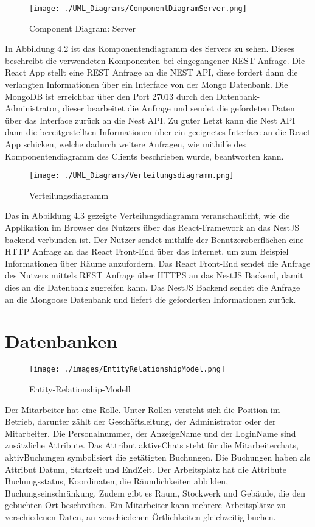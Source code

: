 \begin{figure}[!h]
    \centering
    \texttt{[image: ./UML\_Diagrams/ComponentDiagramServer.png]}
    \caption{Component Diagram: Server}
    \label{fig:ComponentDiagramServer}
\end{figure}
In Abbildung 4.2 ist das Komponentendiagramm des Servers zu sehen.
Dieses beschreibt die verwendeten Komponenten bei eingegangener REST Anfrage.
Die React App stellt eine REST Anfrage an die NEST API, diese fordert dann die verlangten Informationen über ein Interface von der Mongo Datenbank.
Die MongoDB ist erreichbar über den Port 27013 durch den Datenbank-Administrator, dieser bearbeitet die Anfrage und sendet die gefordeten Daten über das Interface zurück an die Nest API.
Zu guter Letzt kann die Nest API dann die bereitgestellten Informationen über ein geeignetes Interface an die React App schicken, welche dadurch weitere Anfragen, wie mithilfe des Komponentendiagramm des Clients beschrieben wurde, beantworten kann.



\begin{figure}[!h]
    \centering
    \texttt{[image: ./UML\_Diagrams/Verteilungsdiagramm.png]}
    \caption{Verteilungsdiagramm}
    \label{fig:Verteilungsdiagramm}
\end{figure}

Das in Abbildung 4.3 gezeigte Verteilungsdiagramm veranschaulicht, wie die Applikation im Browser des Nutzers über das React-Framework an das NestJS backend verbunden ist.
Der Nutzer sendet mithilfe der Benutzeroberflächen eine HTTP Anfrage an das React Front-End über das Internet, um zum Beispiel Informationen über Räume anzufordern.
Das React Front-End sendet die Anfrage des Nutzers mittels REST Anfrage über HTTPS an das NestJS Backend, damit dies an die Datenbank zugreifen kann.
Das NestJS Backend sendet die Anfrage an die Mongoose Datenbank und liefert die geforderten Informationen zurück.

\pagebreak
\section{Datenbanken}
\begin{figure}[!h]
    \centering
    \texttt{[image: ./images/EntityRelationshipModel.png]}
    \caption{Entity-Relationship-Modell}
    \label{fig:EntityRelationshipModel}
\end{figure}
Der Mitarbeiter hat eine Rolle. 
Unter Rollen versteht sich die Position im Betrieb, darunter zählt der Geschäftsleitung, der Administrator oder der Mitarbeiter.
Die Personalnummer, der AnzeigeName und der LoginName sind zusätzliche Attribute.
Das Attribut aktiveChats steht für die Mitarbeiterchats, aktivBuchungen symbolisiert die getätigten Buchungen.
Die Buchungen haben als Attribut Datum, Startzeit und EndZeit.
Der Arbeitsplatz hat die Attribute Buchungsstatus, Koordinaten, die Räumlichkeiten abbilden, Buchungseinschränkung. 
Zudem gibt es Raum, Stockwerk und Gebäude, die den gebuchten Ort beschreiben. 
Ein Mitarbeiter kann mehrere Arbeitsplätze zu verschiedenen Daten, an verschiedenen Örtlichkeiten gleichzeitig buchen. 
